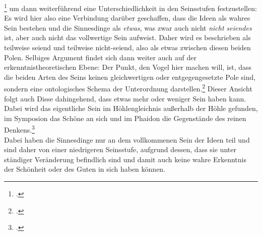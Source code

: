 \footcite[vgl.][S. 162]{Vogel} um dann weiterführend eine Unterschiedlichkeit in den Seinsstufen festzustellen:
Es wird hier also eine Verbindung darüber geschaffen, dass die Ideen als wahres Sein bestehen und die Sinnesdinge als \emph{etwas}, was zwar auch nicht \emph{nicht seiendes} ist, aber auch nicht das vollwertige Sein aufweist. Daher wird es beschrieben als teilweise seiend und teilweise nicht-seiend, also als etwas zwischen diesen beiden Polen. Selbiges Argument findet sich dann weiter auch auf der erkenntnistheoretischen Ebene: 
Der Punkt, den Vogel hier machen will, ist, dass die beiden Arten des Seins keinen gleichwertigen oder entgegengesetzte Pole sind, sondern eine ontologisches Schema der Unterordnung darstellen.\footcite[vgl.][S. 165]{Vogel}
Dieser Ansicht folgt auch Disse dahingehend, dass etwas mehr oder weniger Sein haben kann. Dabei wird das eigentliche Sein im Höhlengleichnis außerhalb der Höhle gefunden, im Symposion das Schöne an sich und im Phaidon die Gegenstände des reinen Denkens.\footcite[vgl.][S. 37]{DisseMetaphysik}\\ Dabei haben die Sinnesdinge nur an dem vollkommenen Sein der Ideen teil und sind daher von einer niedrigeren Seinsstufe, aufgrund dessen, dass sie unter ständiger Veränderung befindlich sind und damit auch keine wahre Erkenntnis der Schönheit oder des Guten in sich haben können.
